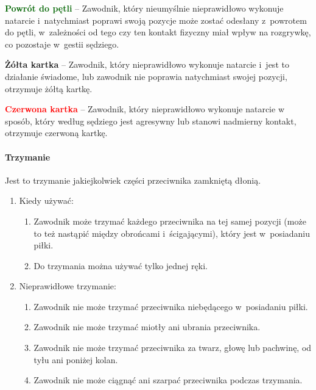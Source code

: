 \documentclass[12pt,a4paper]{article}
\newcommand\redcard[1]{\bgroup\textcolor{red}{\textbf{#1}}}
\newcommand\yellowcard[1]{\bgroup\textcolor{darkyellow}{\textbf{#1}}}
\newcommand\other[1]{\bgroup\textcolor{darkgreen}{\textbf{#1}}}
\begin{document}
\other{Powrót do pętli} -- Zawodnik, który nieumyślnie nieprawidłowo
wykonuje natarcie i~natychmiast poprawi swoją pozycje może zostać
odesłany z~powrotem do pętli, w~zależności od tego czy ten kontakt
fizyczny miał wpływ na rozgrywkę, co pozostaje w~gestii sędziego.

\yellowcard{Żółta kartka} -- Zawodnik, który nieprawidłowo wykonuje natarcie i~jest to działanie świadome, lub zawodnik nie poprawia natychmiast swojej
pozycji, otrzymuje żółtą kartkę.

\redcard{Czerwona kartka} -- Zawodnik, który nieprawidłowo wykonuje natarcie
w sposób, który według sędziego jest agresywny lub stanowi nadmierny
kontakt, otrzymuje czerwoną kartkę.

\paragraph{Trzymanie}
Jest to trzymanie jakiejkolwiek części
przeciwnika zamkniętą dłonią.

\begin{enumerate}
	\item
	      Kiedy używać:

	      \begin{enumerate}
		      \item Zawodnik może trzymać każdego przeciwnika na tej samej pozycji
		            (może to też nastąpić między obrońcami i~ścigającymi), który jest w~posiadaniu piłki.
		      \item
		            Do trzymania można używać tylko jednej ręki.
	      \end{enumerate}
	\item
	      Nieprawidłowe trzymanie:

	      \begin{enumerate}
		      \item
		            Zawodnik nie może trzymać przeciwnika niebędącego w~posiadaniu
		            piłki.
		      \item
		            Zawodnik nie może trzymać miotły ani ubrania przeciwnika.
		      \item
		            Zawodnik nie może trzymać przeciwnika za twarz, głowę lub pachwinę,
		            od tyłu ani poniżej kolan.
		      \item Zawodnik nie może ciągnąć ani szarpać przeciwnika podczas
		            trzymania.
	      \end{enumerate}
\end{enumerate}
\end{document}
